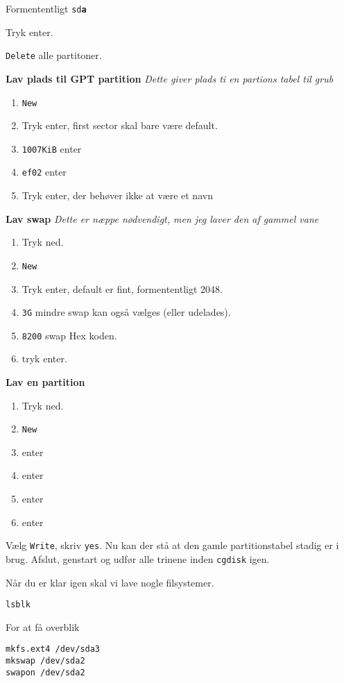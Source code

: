 \documentclass[10pt,a4paper,danish]{article}
\begin{document}
Formententligt \texttt{sd\textbf{a}}

Tryk enter.

\texttt{Delete} alle partitoner.

\textbf{Lav plads til GPT partition}
\textit{Dette giver plads ti en partions tabel til grub}\
\begin{enumerate}
\item \texttt{New}
\item Tryk enter, first sector skal bare  være default.
\item \texttt{1007KiB} enter
\item \texttt{ef02} enter
\item Tryk enter, der behøver ikke at være et navn
\end{enumerate}

\textbf{Lav swap}
\textit{Dette er næppe nødvendigt, men jeg laver den af gammel vane}
\begin{enumerate}
\item Tryk ned.
\item \texttt{New}
\item Tryk enter, default er fint, formententligt 2048.
\item \texttt{3G} mindre swap kan også vælges (eller udelades).
\item \texttt{8200} swap Hex koden.
\item tryk enter.
\end{enumerate}

\textbf{Lav en partition}
\begin{enumerate}
\item Tryk ned.
\item \texttt{New}
\item enter
\item enter
\item enter
\item enter
\end{enumerate}

Vælg \texttt{Write}, skriv \texttt{yes}.
Nu kan der stå at den gamle partitionstabel stadig er i brug.
Afslut, genstart og udfør alle trinene inden \texttt{cgdisk} igen.

Når du er klar igen skal vi lave nogle filsystemer.
\begin{verbatim}
lsblk
\end{verbatim}
For at få overblik

\begin{verbatim}
mkfs.ext4 /dev/sda3
mkswap /dev/sda2
swapon /dev/sda2
\end{verbatim}
\end{document}
